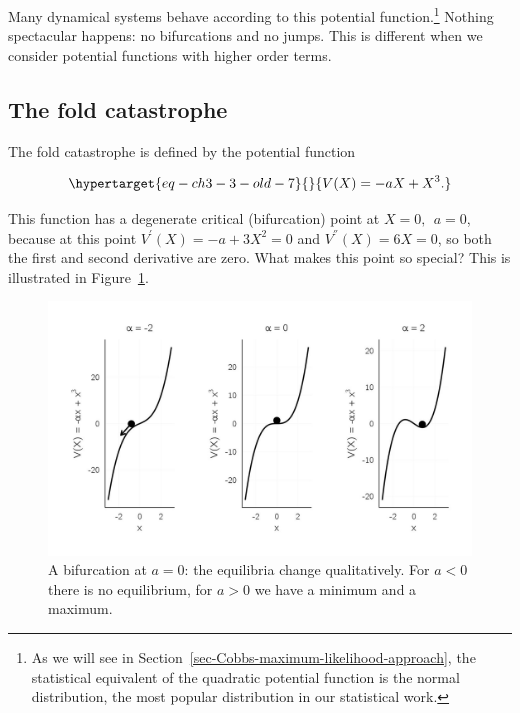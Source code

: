 \documentclass[
  a4paper,
  DIV=11,
  numbers=noendperiod,
  oneside]{scrreprt}
\begin{document}
Many dynamical systems behave according to this potential
function.\footnote{As we will see in
  Section~\ref{sec-Cobbs-maximum-likelihood-approach}, the statistical
  equivalent of the quadratic potential function is the normal
  distribution, the most popular distribution in our statistical work.}
Nothing spectacular happens: no bifurcations and no jumps. This is
different when we consider potential functions with higher order terms.

\hypertarget{sec-The-fold-catastrophe}{%
\subsection{The fold catastrophe}\label{sec-The-fold-catastrophe}}

The fold catastrophe is defined by the potential function

\begin{equation}\protect\hypertarget{eq-ch3-3-old-7}{}{
V(X) = {- aX + X}^{3}.
}\label{eq-ch3-3-old-7}\end{equation}

This function has a degenerate critical (bifurcation) point at
\(X = 0,\ \ a = 0\), because at this point
\(V^{'}(X) = - a + 3X^{2} = 0\) and \(V^{''}(X) = 6X = 0\), so both the
first and second derivative are zero. What makes this point so special?
This is illustrated in Figure~\ref{fig-ch3-img4-old-16}.

\begin{figure}

{\centering \includegraphics{media/ch3/fig-ch3-img4-old-16.jpg}

}

\caption{\label{fig-ch3-img4-old-16}A bifurcation at \(a = 0\): the
equilibria change qualitatively. For \(a<0\) there is no equilibrium,
for \(a>0\) we have a minimum and a maximum.}

\end{figure}
\end{document}
